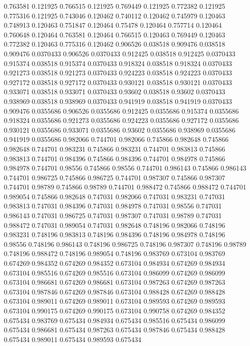 0.763581 0.121925
0.766515 0.121925
0.769449 0.121925
0.772382 0.121925
0.775316 0.121925
0.743046 0.120462
0.740112 0.120462
0.745979 0.120463
0.748913 0.120463
0.751847 0.120464
0.75478 0.120464
0.757714 0.120464
0.760648 0.120464
0.763581 0.120464
0.766515 0.120463
0.769449 0.120463
0.772382 0.120463
0.775316 0.120462
0.906526 0.038518
0.909476 0.038518
0.909476 0.0370433
0.906526 0.0370433
0.912425 0.038518
0.912425 0.0370433
0.915374 0.038518
0.915374 0.0370433
0.918324 0.038518
0.918324 0.0370433
0.921273 0.038518
0.921273 0.0370433
0.924223 0.038518
0.924223 0.0370433
0.927172 0.038518
0.927172 0.0370433
0.930121 0.038518
0.930121 0.0370433
0.933071 0.038518
0.933071 0.0370433
0.93602 0.038518
0.93602 0.0370433
0.938969 0.038518
0.938969 0.0370433
0.941919 0.038518
0.941919 0.0370433
0.909476 0.0355686
0.906526 0.0355686
0.912425 0.0355686
0.915374 0.0355686
0.918324 0.0355686
0.921273 0.0355686
0.924223 0.0355686
0.927172 0.0355686
0.930121 0.0355686
0.933071 0.0355686
0.93602 0.0355686
0.938969 0.0355686
0.941919 0.0355686
0.982066 0.744701
0.982066 0.745866
0.982648 0.745866
0.982648 0.744701
0.983231 0.745866
0.983231 0.744701
0.983813 0.745866
0.983813 0.744701
0.984396 0.745866
0.984396 0.744701
0.984978 0.745866
0.984978 0.744701
0.98556 0.745866
0.98556 0.744701
0.986143 0.745866
0.986143 0.744701
0.986725 0.745866
0.986725 0.744701
0.987307 0.745866
0.987307 0.744701
0.98789 0.745866
0.98789 0.744701
0.988472 0.745866
0.988472 0.744701
0.989054 0.745866
0.982648 0.747031
0.982066 0.747031
0.983231 0.747031
0.983813 0.747031
0.984396 0.747031
0.984978 0.747031
0.98556 0.747031
0.986143 0.747031
0.986725 0.747031
0.987307 0.747031
0.98789 0.747031
0.988472 0.747031
0.989054 0.747031
0.982648 0.748196
0.982066 0.748196
0.983231 0.748196
0.983813 0.748196
0.984396 0.748196
0.984978 0.748196
0.98556 0.748196
0.986143 0.748196
0.986725 0.748196
0.987307 0.748196
0.98789 0.748196
0.988472 0.748196
0.989054 0.748196
0.983769 0.673104
0.983769 0.674269
0.984352 0.674269
0.984352 0.673104
0.984934 0.674269
0.984934 0.673104
0.985516 0.674269
0.985516 0.673104
0.986099 0.674269
0.986099 0.673104
0.986681 0.674269
0.986681 0.673104
0.987263 0.674269
0.987263 0.673104
0.987846 0.674269
0.987846 0.673104
0.988428 0.674269
0.988428 0.673104
0.989011 0.674269
0.989011 0.673104
0.989593 0.674269
0.989593 0.673104
0.990175 0.674269
0.990175 0.673104
0.990758 0.674269
0.984352 0.675434
0.983769 0.675434
0.984934 0.675434
0.985516 0.675434
0.986099 0.675434
0.986681 0.675434
0.987263 0.675434
0.987846 0.675434
0.988428 0.675434
0.989011 0.675434
0.989593 0.675434
